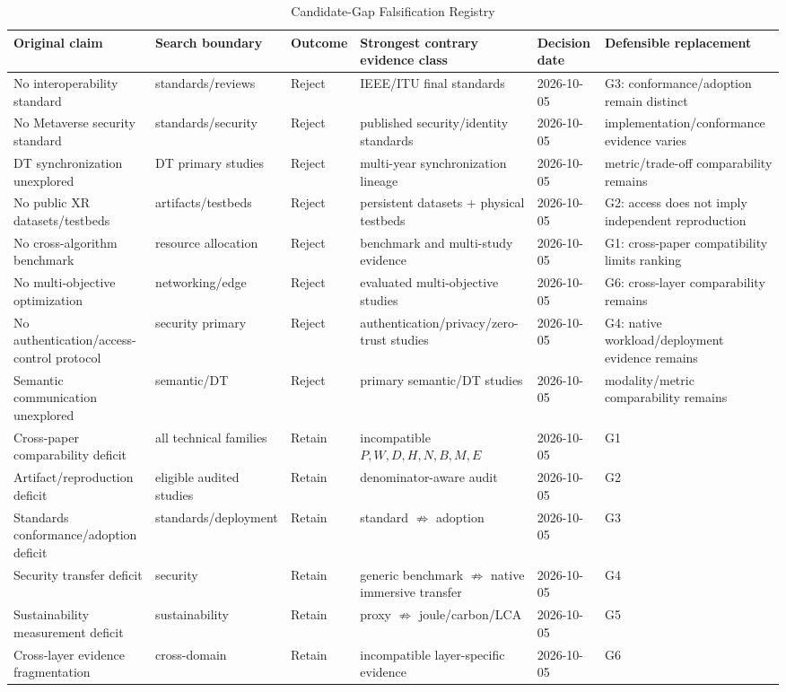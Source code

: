 \begin{table}[!t]
\centering
\caption{Candidate-Gap Falsification Registry}
\label{tab:gapregistry}
\scriptsize
\begin{tabularx}{\textwidth}{p{}p{}p{}p{}p{}Y}
\toprule
Original claim & Search boundary & Outcome & Strongest contrary evidence class & Decision date & Defensible replacement \\
\midrule
No interoperability standard & standards/reviews & Reject & IEEE/ITU final standards & 2026-10-05 & G3: conformance/adoption remain distinct \\
No Metaverse security standard & standards/security & Reject & published security/identity standards & 2026-10-05 & implementation/conformance evidence varies \\
DT synchronization unexplored & DT primary studies & Reject & multi-year synchronization lineage & 2026-10-05 & metric/trade-off comparability remains \\
No public XR datasets/testbeds & artifacts/testbeds & Reject & persistent datasets + physical testbeds & 2026-10-05 & G2: access does not imply independent reproduction \\
No cross-algorithm benchmark & resource allocation & Reject & benchmark and multi-study evidence & 2026-10-05 & G1: cross-paper compatibility limits ranking \\
No multi-objective optimization & networking/edge & Reject & evaluated multi-objective studies & 2026-10-05 & G6: cross-layer comparability remains \\
No authentication/access-control protocol & security primary & Reject & authentication/privacy/zero-trust studies & 2026-10-05 & G4: native workload/deployment evidence remains \\
Semantic communication unexplored & semantic/DT & Reject & primary semantic/DT studies & 2026-10-05 & modality/metric comparability remains \\
\midrule
Cross-paper comparability deficit & all technical families & Retain & incompatible $P,W,D,H,N,B,M,E$ & 2026-10-05 & G1 \\
Artifact/reproduction deficit & eligible audited studies & Retain & denominator-aware audit & 2026-10-05 & G2 \\
Standards conformance/adoption deficit & standards/deployment & Retain & standard $\not\Rightarrow$ adoption & 2026-10-05 & G3 \\
Security transfer deficit & security & Retain & generic benchmark $\not\Rightarrow$ native immersive transfer & 2026-10-05 & G4 \\
Sustainability measurement deficit & sustainability & Retain & proxy $\not\Rightarrow$ joule/carbon/LCA & 2026-10-05 & G5 \\
Cross-layer evidence fragmentation & cross-domain & Retain & incompatible layer-specific evidence & 2026-10-05 & G6 \\
\bottomrule
\end{tabularx}
\end{table}
